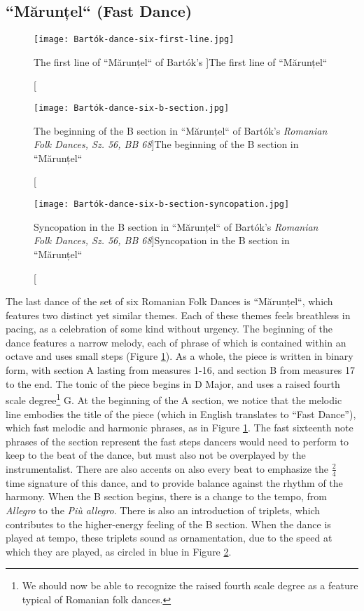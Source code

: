 \subsection{``Mărunțel`` (Fast Dance)}

\begin{figure}
  \centering
  \texttt{[image: Bartók-dance-six-first-line.jpg]}
  \caption[The first line of ``Mărunțel`` of Bartók's ]{The first line of ``Mărunțel``}
  \label{fig:Bartók-dance-six-first-line}
\end{figure}

\begin{figure}
  \centering
  \texttt{[image: Bartók-dance-six-b-section.jpg]}
  \caption[The beginning of the B section in ``Mărunțel`` of Bartók's \textit{Romanian Folk Dances, Sz. 56, BB 68}]{The beginning of the B section in ``Mărunțel``}
  \label{fig:Bartók-dance-six-b-section}
\end{figure}

\begin{figure}
  \centering
  \texttt{[image: Bartók-dance-six-b-section-syncopation.jpg]}
  \caption[Syncopation in the B section in ``Mărunțel`` of Bartók's \textit{Romanian Folk Dances, Sz. 56, BB 68}]{Syncopation in the B section in ``Mărunțel``}
  \label{fig:Bartók-dance-six-b-section-syncopation}
\end{figure}


The last dance of the set of six Romanian Folk Dances is ``Mărunțel``, which features two distinct yet similar themes. Each of these themes feels breathless in pacing, as a celebration of some kind without urgency. The beginning of the dance features a narrow melody, each of phrase of which is contained within an octave and uses small steps (Figure \ref{fig:Bartók-dance-six-first-line}\autocite{Lung_2016}). As a whole, the piece is written in binary form, with section A lasting from measures 1-16, and section B from measures 17 to the end. The tonic of the piece begins in D Major, and uses a raised fourth scale degree\footnote{We should now be able to recognize the raised fourth scale degree as a feature typical of Romanian folk dances.} G\musSharp{}. At the beginning of the A section, we notice that the melodic line embodies the title of the piece (which in English translates to ``Fast Dance''), which fast melodic and harmonic phrases, as in Figure \ref{fig:Bartók-dance-six-first-line}\autocite{Lung_2016}. The fast sixteenth note phrases of the section represent the fast steps dancers would need to perform to keep to the beat of the dance, but must also not be overplayed by the instrumentalist. There are also accents on also every beat to emphasize the $\frac{2}{4}$ time signature of this dance, and to provide balance against the rhythm of the harmony. When the B section begins, there is a change to the tempo, from \textit{Allegro} to the \textit{Più allegro}. There is also an introduction of triplets, which contributes to the higher-energy feeling of the B section. When the dance is played at tempo, these triplets sound as ornamentation, due to the speed at which they are played, as circled in blue in Figure \ref{fig:Bartók-dance-six-b-section}\autocite{Lung_2016}. 

